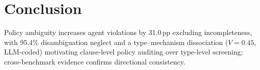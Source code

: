\section{Conclusion}

Policy ambiguity increases agent violations by 31.0\,pp excluding incompleteness, with 95.4\% disambiguation neglect and a type--mechanism dissociation ($V = 0.45$, LLM-coded) motivating clause-level policy auditing over type-level screening; cross-benchmark evidence confirms directional consistency.
